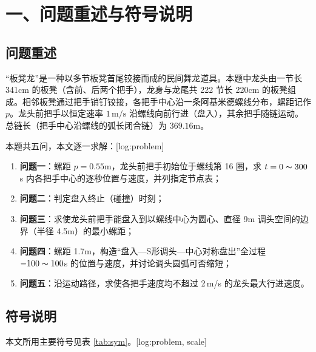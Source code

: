 \section*{一、问题重述与符号说明}

\subsection{问题重述}
“板凳龙”是一种以多节板凳首尾铰接而成的民间舞龙道具。本题中龙头由一节长 341cm 的板凳（含前、后两个把手），龙身与龙尾共 222 节长 220cm 的板凳组成。相邻板凳通过把手销钉铰接，各把手中心沿一条阿基米德螺线分布，螺距记作 $p$。龙头前把手以恒定速率 $1\,\text{m/s}$ 沿螺线向前行进（盘入），其余把手随链运动。总链长（把手中心沿螺线的弧长闭合链）为 $369.16$m。

本题共五问，本文逐一求解：[log:problem]
\begin{enumerate}
\item \textbf{问题一}：螺距 $p=0.55$m，龙头前把手初始位于螺线第 16 圈，求 $t=0\thicksim300$s 内各把手中心的逐秒位置与速度，并列指定节点表；
\item \textbf{问题二}：判定盘入终止（碰撞）时刻；
\item \textbf{问题三}：求使龙头前把手能盘入到以螺线中心为圆心、直径 9m 调头空间的边界（半径 4.5m）的最小螺距；
\item \textbf{问题四}：螺距 1.7m，构造“盘入—S形调头—中心对称盘出”全过程 $-100\thicksim100$s 的位置与速度，并讨论调头圆弧可否缩短；
\item \textbf{问题五}：沿运动路径，求使各把手速度均不超过 2\,m/s 的龙头最大行进速度。
\end{enumerate}

\subsection{符号说明}
本文所用主要符号见表 \ref{tab:sym}。[log:problem, scale]

